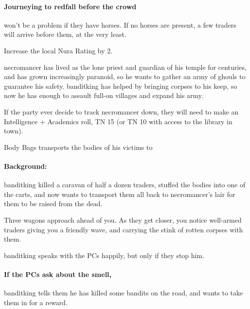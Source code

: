 \begin{multicols}{2}
\paragraph{Journeying to \gls{redfall} before the crowd}
won't be a problem if they have horses.
If no horses are present, a few traders will arrive before them, at the very least.

Increase the local Nura Rating by 2.

\stopcontents[sq]

\resumecontents[Forest]


\stopcontents[Forest]

\startcontents[sq]

\sqminitoc

\noindent
\Gls{necromancer} has lived as the lone priest and guardian of his temple for centuries, and has grown increasingly paranoid, so he wants to gather an army of ghouls to guarantee his safety.
\Gls{banditking} has helped by bringing corpses to his keep, so now he has enough to assault full-on villages and expand his army.

If the party ever decide to track \gls{necromancer} down, they will need to make an Intelligence + Academics roll, TN 15 (or TN 10 with access to the library in town).

{Body Bags}%
{ transports the bodies of his victims to }%

\paragraph{Background:}
\Gls{banditking} killed a caravan of half a dozen traders, stuffed the bodies into one of the carts, and now wants to transport them all back to \gls{necromancer}'s lair for them to be raised from the dead.

\begin{boxtext}
  Three wagons approach ahead of you.
  As they get closer, you notice well-armed traders giving you a friendly wave, and carrying the stink of rotten corpses with them.
\end{boxtext}

\Gls{banditking} speaks with the PCs happily, but only if they stop him.

\paragraph{If the PCs ask about the smell,}
\gls{banditking} tells them he has killed some bandits on the road, and wants to take them in for a reward.


\end{multicols}
